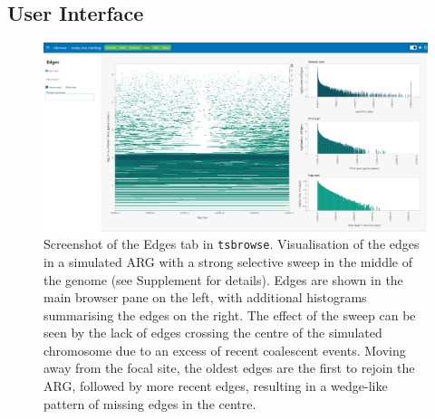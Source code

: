 \documentclass[unnumsec,webpdf,contemporary,large,namedate]{oup-authoring-template}%
\begin{document}
\subsection{User Interface} \label{subsec:User_Interface} \begin{figure}
    \centering \includegraphics[width=0.95\linewidth]{figures/MainFig2.png}
    \caption{Screenshot of the Edges tab in \texttt{tsbrowse}.
        Visualisation of the edges in a simulated ARG with a strong selective
        sweep in the middle of the genome (see Supplement for details).
        Edges are shown in the main browser pane on the left, with additional
        histograms summarising the edges on the right.
        The effect of the sweep can be seen by the lack of edges crossing the
        centre of the simulated chromosome due to an excess of recent coalescent
        events. Moving away from the focal site, the oldest edges are the
        first to rejoin the ARG, followed by more recent edges, resulting in a
        wedge-like pattern of missing edges in the centre.
        \label{fig:Figure_2}}
\end{figure}
\end{document}
